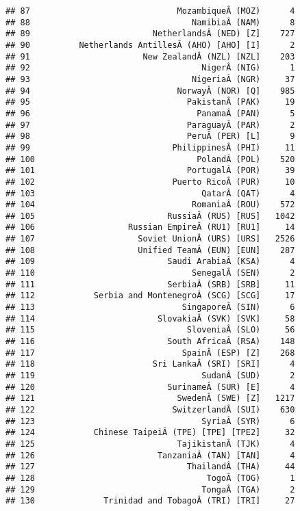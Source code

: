 \documentclass[
]{article}
\begin{document}
\begin{verbatim}
## 87                              MozambiqueÂ (MOZ)      4
## 88                                 NamibiaÂ (NAM)      8
## 89                         NetherlandsÂ (NED) [Z]    727
## 90          Netherlands AntillesÂ (AHO) [AHO] [I]      2
## 91                       New ZealandÂ (NZL) [NZL]    203
## 92                                   NigerÂ (NIG)      1
## 93                                 NigeriaÂ (NGR)     37
## 94                              NorwayÂ (NOR) [Q]    985
## 95                                PakistanÂ (PAK)     19
## 96                                  PanamaÂ (PAN)      5
## 97                                ParaguayÂ (PAR)      2
## 98                                PeruÂ (PER) [L]      9
## 99                             PhilippinesÂ (PHI)     11
## 100                                 PolandÂ (POL)    520
## 101                               PortugalÂ (POR)     39
## 102                            Puerto RicoÂ (PUR)     10
## 103                                  QatarÂ (QAT)      4
## 104                                RomaniaÂ (ROU)    572
## 105                           RussiaÂ (RUS) [RUS]   1042
## 106                   Russian EmpireÂ (RU1) [RU1]     14
## 107                     Soviet UnionÂ (URS) [URS]   2526
## 108                     Unified TeamÂ (EUN) [EUN]    287
## 109                           Saudi ArabiaÂ (KSA)      4
## 110                                SenegalÂ (SEN)      2
## 111                           SerbiaÂ (SRB) [SRB]     11
## 112            Serbia and MontenegroÂ (SCG) [SCG]     17
## 113                              SingaporeÂ (SIN)      6
## 114                         SlovakiaÂ (SVK) [SVK]     58
## 115                               SloveniaÂ (SLO)     56
## 116                           South AfricaÂ (RSA)    148
## 117                              SpainÂ (ESP) [Z]    268
## 118                        Sri LankaÂ (SRI) [SRI]      4
## 119                                  SudanÂ (SUD)      2
## 120                           SurinameÂ (SUR) [E]      4
## 121                             SwedenÂ (SWE) [Z]   1217
## 122                            SwitzerlandÂ (SUI)    630
## 123                                  SyriaÂ (SYR)      6
## 124            Chinese TaipeiÂ (TPE) [TPE] [TPE2]     32
## 125                             TajikistanÂ (TJK)      4
## 126                         TanzaniaÂ (TAN) [TAN]      4
## 127                               ThailandÂ (THA)     44
## 128                                   TogoÂ (TOG)      1
## 129                                  TongaÂ (TGA)      2
## 130              Trinidad and TobagoÂ (TRI) [TRI]     27

\end{verbatim}
\end{document}
